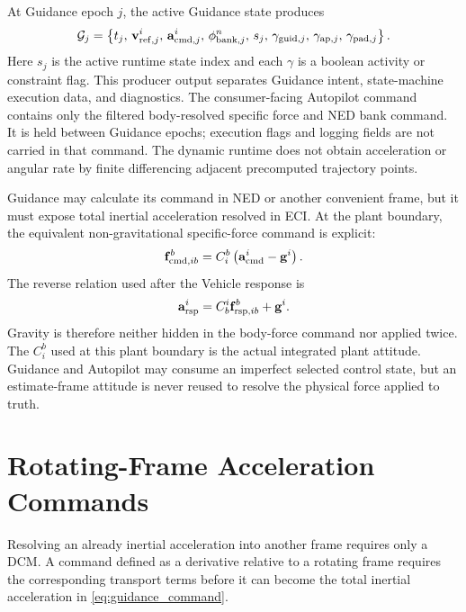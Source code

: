 At Guidance epoch $j$, the active Guidance state produces
\begin{equation}
\mathcal{G}_{j}=
\left\{
t_j,\,
\mathbf{v}_{\mathrm{ref},j}^{i},\,
\mathbf{a}_{\mathrm{cmd},j}^{i},\,
\phi_{\mathrm{bank},j}^{n},\,
s_j,\,
\gamma_{\mathrm{guid},j},\,
\gamma_{\mathrm{ap},j},\,
\gamma_{\mathrm{pad},j}
\right\}.
\label{eq:guidance_command}
\end{equation}
Here $s_j$ is the active runtime state index and each $\gamma$ is a boolean activity or
constraint flag. This producer output separates Guidance intent, state-machine
execution data, and diagnostics. The consumer-facing Autopilot command contains
only the filtered body-resolved specific force and NED bank command. It is held
between Guidance epochs; execution flags and logging fields are not carried in
that command. The dynamic runtime does not obtain acceleration or angular rate
by finite differencing adjacent precomputed trajectory points.

Guidance may calculate its command in NED or another convenient frame, but it
must expose total inertial acceleration resolved in ECI. At the plant boundary,
the equivalent non-gravitational specific-force command is explicit:
\begin{equation}
\mathbf{f}_{\mathrm{cmd},ib}^{b}
=
C_i^b
\left(
\mathbf{a}_{\mathrm{cmd}}^{i}-\mathbf{g}^{i}
\right).
\label{eq:guidance_acceleration_to_force}
\end{equation}
The reverse relation used after the Vehicle response is
\begin{equation}
\mathbf{a}_{\mathrm{rsp}}^{i}
=
C_b^i\mathbf{f}_{\mathrm{rsp},ib}^{b}+\mathbf{g}^{i}.
\label{eq:force_to_realized_acceleration}
\end{equation}
Gravity is therefore neither hidden in the body-force command nor applied
twice. The $C_i^b$ used at this plant boundary is the actual integrated
plant attitude. Guidance and Autopilot may consume an imperfect selected
control state, but an estimate-frame attitude is never reused to resolve the
physical force applied to truth.

\section{Rotating-Frame Acceleration Commands}

Resolving an already inertial acceleration into another frame requires only a
DCM. A command defined as a derivative relative to a rotating frame requires
the corresponding transport terms before it can become the total inertial
acceleration in \cref{eq:guidance_command}.

